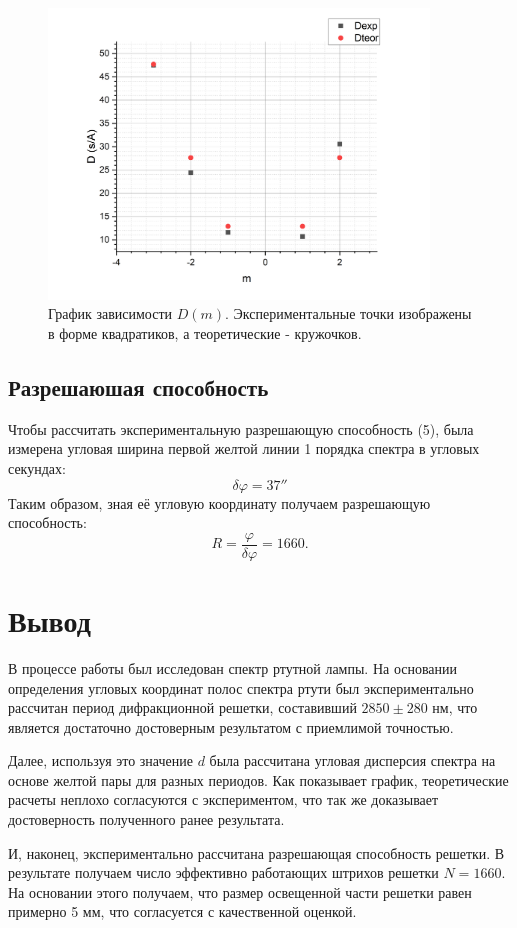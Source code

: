 \documentclass[a4paper, 14pt]{extarticle}%
\newcommand\ECaption[1]{%
     \captionsetup{font=footnotesize}%
     \caption{#1}}
\begin{document}
\begin{figure}[h!]
\begin{center}
\includegraphics[width=0.9\textwidth]{gr2}
\end{center}
\ECaption{График зависимости $D(m)$. Экспериментальные точки изображены в форме квадратиков, а теоретические - кружочков.}
\end{figure} 

\subsection*{Разрешаюшая способность}

Чтобы рассчитать экспериментальную разрешающую способность (5), была измерена угловая ширина первой желтой линии 1 порядка спектра в угловых секундах:
\[\delta\varphi = 37''\]
Таким образом, зная её угловую координату получаем разрешающую способность:
\[R = \frac{\varphi}{\delta\varphi} = 1660.\]
\newpage
\section*{Вывод}

В процессе работы был исследован спектр ртутной лампы. На основании определения угловых координат полос спектра ртути был экспериментально рассчитан период дифракционной решетки, составивший $2850\pm 280$ нм, что является достаточно достоверным результатом с приемлимой точностью.

Далее, используя это значение $d$ была рассчитана угловая дисперсия спектра на основе желтой пары для разных периодов. Как показывает график, теоретические расчеты неплохо согласуются с экспериментом, что так же доказывает достоверность полученного ранее результата. 

И, наконец, экспериментально рассчитана разрешающая способность решетки. В результате получаем число эффективно работающих штрихов решетки $N = 1660$. На основании этого получаем, что размер освещенной части решетки равен примерно 5 мм, что согласуется с качественной оценкой.
\end{document}
